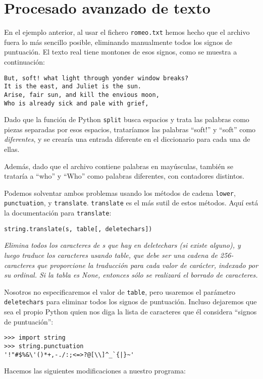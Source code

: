 \section{Procesado avanzado de texto}

En el ejemplo anterior, al usar el fichero {\tt romeo.txt}
hemos hecho que el archivo fuera lo más sencillo posible, eliminando
manualmente todos los signos de puntuación. El texto real
tiene montones de esos signos, como se muestra a continuación:

\beforeverb
\begin{verbatim}
But, soft! what light through yonder window breaks?
It is the east, and Juliet is the sun.
Arise, fair sun, and kill the envious moon,
Who is already sick and pale with grief,
\end{verbatim}
\afterverb
%
Dado que la función de Python {\tt split} busca espacios y
trata las palabras como piezas separadas por esos espacios, trataríamos
las palabras ``soft!'' y ``soft'' como \emph{diferentes}, y se crearía
una entrada diferente en el diccionario para cada una de ellas.

Además, dado que el archivo contiene palabras en mayúsculas, también se
trataría a ``who'' y ``Who'' como palabras diferentes, con contadores
distintos.

Podemos solventar ambos problemas usando los métodos
de cadena {\tt lower}, {\tt punctuation}, y {\tt translate}.
{\tt translate} es el más sutil de estos métodos.
Aquí está la documentación para {\tt translate}:

\verb"string.translate(s, table[, deletechars])"

\emph{Elimina todos los caracteres de s que hay en deletechars (si existe alguno),
y luego traduce los caracteres usando table, que debe ser una cadena
de 256-caracteres que proporcione la traducción para cada
valor de carácter, indexado por su ordinal. Si la tabla es None,
entonces sólo se realizará el borrado de caracteres.}

Nosotros no especificaremos el valor de {\tt table}, pero usaremos
el parámetro {\tt deletechars} para eliminar todos los signos de puntuación.
Incluso dejaremos que sea el propio Python quien nos diga la lista de caracteres
que él considera ``signos de puntuación'':

\beforeverb
\begin{verbatim}
>>> import string
>>> string.punctuation
'!"#$%&\'()*+,-./:;<=>?@[\\]^_`{|}~'
\end{verbatim}
\afterverb
%
Hacemos las siguientes modificaciones a nuestro programa:

